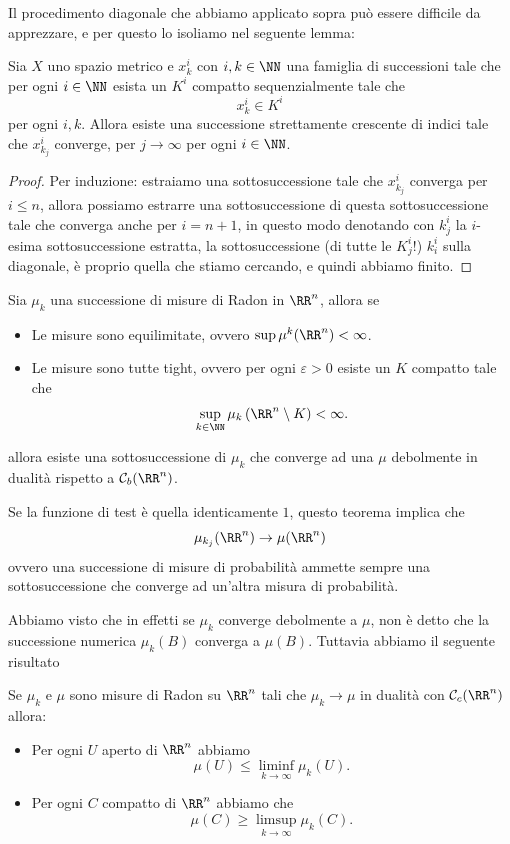 \documentclass[11pt]{scrartcl}
\begin{document}
	Il procedimento diagonale che abbiamo applicato sopra può essere difficile da apprezzare, e per questo lo isoliamo nel seguente lemma:
	\begin{lemma}
		Sia $X$ uno spazio metrico e $x_k^i$ con $i,k\in\NN$ una famiglia di successioni tale che per ogni $i\in\NN$ esista un $K^i$ compatto sequenzialmente tale che
		$$x_k^i\in K^i$$
		per ogni $i,k$. Allora esiste una successione strettamente crescente di indici tale che 
		$x^i_{k_j}$ converge, per $j\to\infty$ per ogni $i\in\NN$.
	\end{lemma}
	\begin{proof}
		Per induzione: estraiamo una sottosuccessione tale che $x^i_{k_j}$ converga per $i\le n$, allora possiamo estrarre una sottosuccessione di questa sottosuccessione tale che converga anche per $i=n+1$, in questo modo denotando con $k^i_j$ la $i$-esima sottosuccessione estratta, la sottosuccessione (di tutte le $K^i_j$!) $k_i^i$ sulla diagonale, è proprio quella che stiamo cercando, e quindi abbiamo finito.
	\end{proof}
	\begin{theorem}[Prokhorov]
		Sia $\mu_k$ una successione di misure di Radon in $\RR^n$, allora se
		\begin{itemize}
			\item Le misure sono equilimitate, ovvero $\sup \mu^k(\RR^n)<\infty$.
			\item Le misure sono tutte tight, ovvero per ogni $\varepsilon>0$ esiste un $K$ compatto tale che
			$$\sup_{k\in\NN}\mu_k\left(\RR^n\setminus K\right)<\infty.$$
		\end{itemize}
		allora esiste una sottosuccessione di $\mu_k$ che converge ad una $\mu$ debolmente in dualità rispetto a $\mathcal{C}_b(\RR^n)$.
	\end{theorem}
	\begin{remark}[Probabilità]
		Se la funzione di test è quella identicamente $1$, questo teorema implica che
		$$\mu_{k_j}(\RR^n)\to \mu(\RR^n)$$
		ovvero una successione di misure di probabilità ammette sempre una sottosuccessione che converge ad un'altra misura di probabilità.
	\end{remark}
	Abbiamo visto che in effetti se $\mu_k$ converge debolmente a $\mu$, non è detto che la successione numerica $\mu_k(B)$ converga a $\mu(B)$. Tuttavia abbiamo il seguente risultato 
	\begin{proposition}
		Se $\mu_k$ e $\mu$ sono misure di Radon su $\RR^n$ tali che $\mu_k\to\mu$ in dualità con $\mathcal{C}_c(\RR^n)$ allora:
		\begin{itemize}
			\item Per ogni $U$ aperto di $\RR^n$ abbiamo
			$$\mu(U)\le \liminf_{k\to\infty}\mu_k(U).$$
			\item Per ogni $C$ compatto di $\RR^n$ abbiamo che 
			$$\mu(C)\ge \limsup_{k\to\infty}\mu_k(C).$$ 
		\end{itemize}
	\end{proposition}
\end{document}
